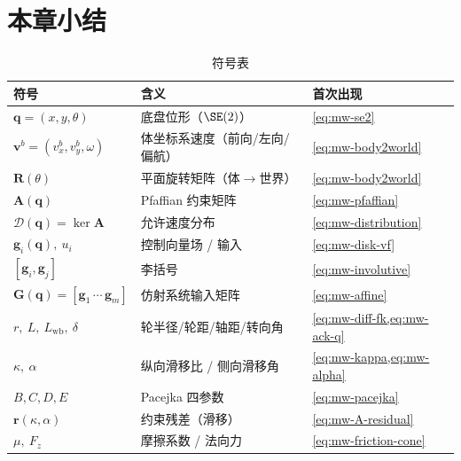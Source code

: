 \section*{本章小结}

\begin{table}[H]\centering\small
\caption{符号表}
\begin{tabular}{lll}
\toprule
符号 & 含义 & 首次出现 \\
\midrule
$\mathbf{q}=(x,y,\theta)$ & 底盘位形（$\SE(2)$） & \cref{eq:mw-se2} \\
$\mathbf{v}^b=(v_x^b,v_y^b,\omega)$ & 体坐标系速度（前向/左向/偏航） & \cref{eq:mw-body2world} \\
$\mathbf{R}(\theta)$ & 平面旋转矩阵（体$\to$世界） & \cref{eq:mw-body2world} \\
$\mathbf{A}(\mathbf{q})$ & Pfaffian 约束矩阵 & \cref{eq:mw-pfaffian} \\
$\mathcal{D}(\mathbf{q})=\ker\mathbf{A}$ & 允许速度分布 & \cref{eq:mw-distribution} \\
$\mathbf{g}_i(\mathbf{q}),\ u_i$ & 控制向量场 / 输入 & \cref{eq:mw-disk-vf} \\
$[\mathbf{g}_i,\mathbf{g}_j]$ & 李括号 & \cref{eq:mw-involutive} \\
$\mathbf{G}(\mathbf{q})=[\mathbf{g}_1\,\cdots\,\mathbf{g}_m]$ & 仿射系统输入矩阵 & \cref{eq:mw-affine} \\
$r,\ L,\ L_{\text{wb}},\ \delta$ & 轮半径/轮距/轴距/转向角 & \cref{eq:mw-diff-fk,eq:mw-ack-q} \\
$\kappa,\ \alpha$ & 纵向滑移比 / 侧向滑移角 & \cref{eq:mw-kappa,eq:mw-alpha} \\
$B,C,D,E$ & Pacejka 四参数 & \cref{eq:mw-pacejka} \\
$\mathbf{r}(\kappa,\alpha)$ & 约束残差（滑移） & \cref{eq:mw-A-residual} \\
$\mu,\ F_z$ & 摩擦系数 / 法向力 & \cref{eq:mw-friction-cone} \\
\bottomrule
\end{tabular}
\end{table}

